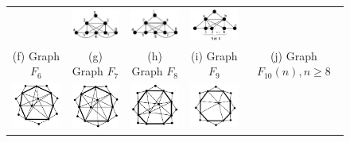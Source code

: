 \begin{figure}[htb]
\begin{tabular}{  c c c c  c}
    & 
    \includegraphics[width=3cm]{img/f8.png} 
    & 
    \includegraphics[width=3cm]{img/f9.png} 
    & 
    \includegraphics[width=3cm]{img/f10n.png} 
    \\ %
    \footnotesize 
    (f)  \footnotesize Graph $F_6$ 
    & 
    \footnotesize (g) Graph $F_7$
    & 
    \footnotesize (h) Graph $F_8$
    & 
    \footnotesize (i) Graph $F_9$
    & 
    \footnotesize (j) Graph $F_{10}(n), n\geq  8$
    \\%
        \includegraphics[width=3cm]{img/f11.png} 
    & 
    \includegraphics[width=3cm]{img/f12.png} 
    & 
    \includegraphics[width=3cm]{img/f13.png} 
    & 
    \includegraphics[width=3cm]{img/f14.png} 

\end{tabular}
\end{figure}
